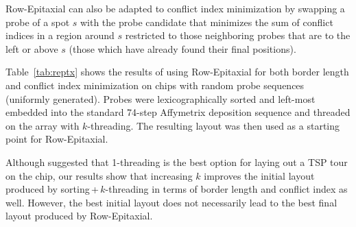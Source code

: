Row-Epitaxial can also be adapted to conflict index minimization by swapping a
probe of a spot $s$ with the probe candidate that minimizes the sum of conflict
indices in a region around $s$ restricted to those neighboring probes that are
to the left or above $s$ (those which have already found their final positions).

Table~\ref{tab:reptx} shows the results of using Row-Epitaxial for both border
length and conflict index minimization on chips with random probe sequences
(uniformly generated). Probes were lexicographically sorted and left-most
embedded into the standard 74-step Affymetrix deposition sequence and threaded
on the array with $k$-threading. The resulting layout was then used as a
starting point for Row-Epitaxial.

Although \citet{Hannenhalli2002} suggested that 1-threading is the best option
for laying out a TSP tour on the chip, our results show that increasing $k$
improves the initial layout produced by sorting\,+\,$k$-threading in terms of
border length and conflict index as well. However, the best initial layout does
not necessarily lead to the best final layout produced by Row-Epitaxial.


